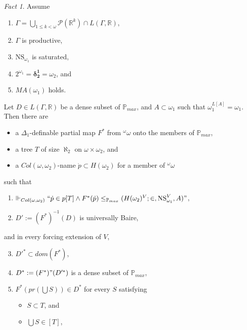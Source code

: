 \documentclass[12pt, twoside]{memoir}
\numberwithin{equation}{section}
\theoremstyle{definition}
\theoremstyle{remark}
\newtheorem{fact}[thm]{Fact}
\theoremstyle{definition}
\theoremstyle{definition}
\theoremstyle{definition}
\theoremstyle{remark}
\begin{document}
\begin{fact}\label{fact434}
Assume
\begin{enumerate}[label=(\roman*), leftmargin=40pt]
    \item $\Gamma  = \bigcup_{1 \leq k < \omega} \mathcal{P}(\mathbb{R}^{k}) \cap L(\Gamma, \mathbb{R})$,
    \item $\Gamma$ is productive,
    \item $\mathrm{NS}_{\omega_1}$ is saturated,
    \item $2^{\omega_1} = \mathbf{\delta^1_2} = \omega_2$, and
    \item $MA(\omega_1)$ holds.
\end{enumerate}
Let $D \in L(\Gamma, \mathbb{R})$ be a dense subset of $\mathbb{P}_{max}$, and $A \subset \omega_1$ such that $\omega_1^{L[A]} = \omega_1$. Then there are
\begin{itemize}
    \item a $\Delta_1$-definable partial map $F^*$ from $^{\omega}{\omega}$ onto the members of $\mathbb{P}_{max}$,
    \item a tree $T$ of size $\aleph_2$ on $\omega \times \omega_2$, and
    \item a $Col(\omega, \omega_2)$-name $\dot{p} \subset H(\omega_2)$ for a member of ${^{\omega}{\omega}}$
\end{itemize}
such that 
\begin{enumerate}[label=(4.34.\arabic*), leftmargin=50pt]
    \item\label{4341} $\Vdash_{Col(\omega, \omega_2)} ``\dot{p} \in p[T] \wedge F^*(\dot{p}) \leq_{\mathbb{P}_{max}} (H(\omega_2)^V; \in, \mathrm{NS}_{\omega_1}^V, A)"$,
    \item\label{4342} $D' := (F^*)^{-1}(D)$ is universally Baire, 
\end{enumerate}
and in every forcing extension of $V$,
\begin{enumerate}[label=(4.34.\arabic*), leftmargin=50pt]
    \setcounter{enumi}{2}
    \item\label{4343} $D'^* \subset dom(F^*)$,
    \item\label{4344} $D^* := (F^*) " (D'^*)$ is a dense subset of $\mathbb{P}_{max}$, 
    \item\label{4345} $F^*(pr(\bigcup S)) \in D^*$ for every $S$ satisfying
    \begin{itemize}
        \item $S \subset T$, and
        \item $\bigcup S \in [T]$, 
    \end{itemize}

\end{enumerate}
\end{fact}
\end{document}

